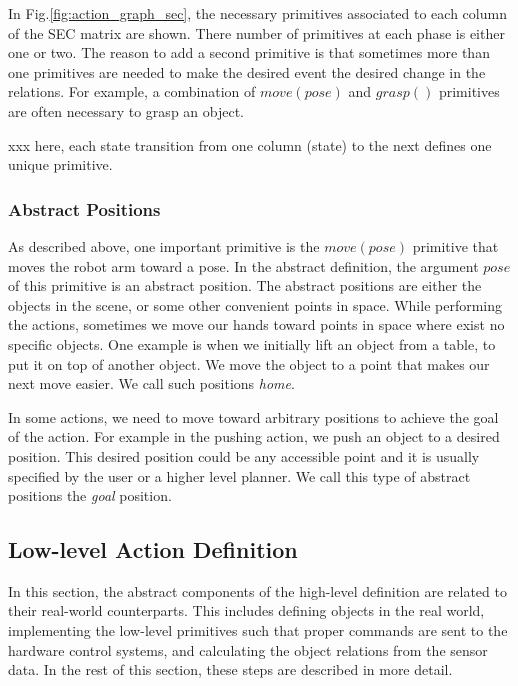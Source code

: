 In Fig.\ref{fig:action_graph_sec}, the necessary primitives associated to each column of the SEC matrix are shown.
There number of primitives at each phase is either one or two.
The reason to add a second primitive is that sometimes more than one primitives are needed to make the desired event \ie the desired change in the relations.
For example, a combination of $move(pose)$ and $grasp()$ primitives are often necessary to grasp an object.

xxx here, each state transition from one column (state) to the next defines one unique primitive.


\subsubsection{Abstract Positions}

As described above, one important primitive is the $move(pose)$ primitive that moves the robot arm toward a pose.
In the abstract definition, the argument $pose$ of this primitive is an abstract position.
The abstract positions are either the objects in the scene, or some other convenient points in space.
While performing the actions, sometimes we move our hands toward points in space where exist no specific objects.
One example is when we initially lift an object from a table, to put it on top of another object.
We move the object to a point that makes our next move easier.
We call such positions \textit{home}.

In some actions, we need to move toward arbitrary positions to achieve the goal of the action.
For example in the pushing action, we push an object to a desired position.
This desired position could be any accessible point and it is usually specified by the user or a higher level planner.
We call this type of abstract positions the \textit{goal} position.



\subsection{Low-level Action Definition}
\label{sec:low-level}
In this section, the abstract components of the high-level definition are related to their real-world counterparts.
This includes defining objects in the real world, implementing the low-level primitives such that proper commands are sent to the hardware control systems,
and calculating the object relations from the sensor data.
In the rest of this section, these steps are described in more detail.


